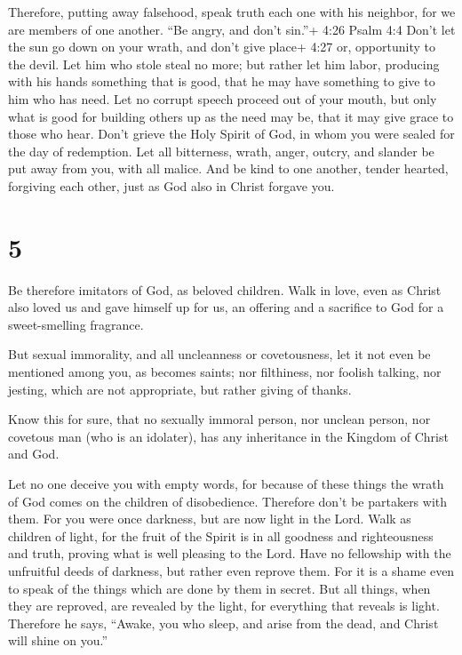  Therefore, putting away falsehood, speak truth each one
with his neighbor, for we are members of one another.  ``Be
angry, and don't sin.''+ 4:26 Psalm 4:4 Don't let the sun go down on
your wrath,  and don't give place+ 4:27 or, opportunity to
the devil.  Let him who stole steal no more; but rather let
him labor, producing with his hands something that is good, that he may
have something to give to him who has need.  Let no corrupt
speech proceed out of your mouth, but only what is good for building
others up as the need may be, that it may give grace to those who hear.
 Don't grieve the Holy Spirit of God, in whom you were
sealed for the day of redemption.  Let all bitterness,
wrath, anger, outcry, and slander be put away from you, with all malice.
 And be kind to one another, tender hearted, forgiving each
other, just as God also in Christ forgave you.

\hypertarget{section-4}{%
\section{5}\label{section-4}}

 Be therefore imitators of God, as beloved children.
 Walk in love, even as Christ also loved us and gave himself
up for us, an offering and a sacrifice to God for a sweet-smelling
fragrance.

 But sexual immorality, and all uncleanness or covetousness,
let it not even be mentioned among you, as becomes saints; 
nor filthiness, nor foolish talking, nor jesting, which are not
appropriate, but rather giving of thanks.

 Know this for sure, that no sexually immoral person, nor
unclean person, nor covetous man (who is an idolater), has any
inheritance in the Kingdom of Christ and God.

 Let no one deceive you with empty words, for because of
these things the wrath of God comes on the children of disobedience.
 Therefore don't be partakers with them.  For
you were once darkness, but are now light in the Lord. Walk as children
of light,  for the fruit of the Spirit is in all goodness
and righteousness and truth,  proving what is well pleasing
to the Lord.  Have no fellowship with the unfruitful deeds
of darkness, but rather even reprove them.  For it is a
shame even to speak of the things which are done by them in secret.
 But all things, when they are reproved, are revealed by
the light, for everything that reveals is light.  Therefore
he says, ``Awake, you who sleep, and arise from the dead, and Christ
will shine on you.''

